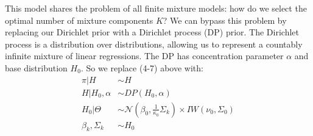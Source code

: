 \documentclass[10pt]{proc}
\begin{document}
This model shares the problem of all finite mixture models: how do we select the
optimal number of mixture components $K$? We can bypass this problem by
replacing our Dirichlet prior with a Dirichlet process (DP) prior. The Dirichlet
process is a distribution over distributions, allowing us to represent a
countably infinite mixture of linear regressions. The DP has concentration
parameter $\alpha$ and base distribution $H_0$. So we replace (4-7) above with:
%
\begin{align}
    \pi | H &\sim H  \\
    H | H_0, \alpha &\sim DP(H_0, \alpha)  \\
    H_0 | \Theta &\sim \mathcal{N}\left(
        \beta_0, \frac{1}{\kappa_0} \Sigma_k
    \right) \times IW(\nu_0, \Sigma_0) \\
    \beta_k, \Sigma_k &\sim H_0
\end{align}
\end{document}
